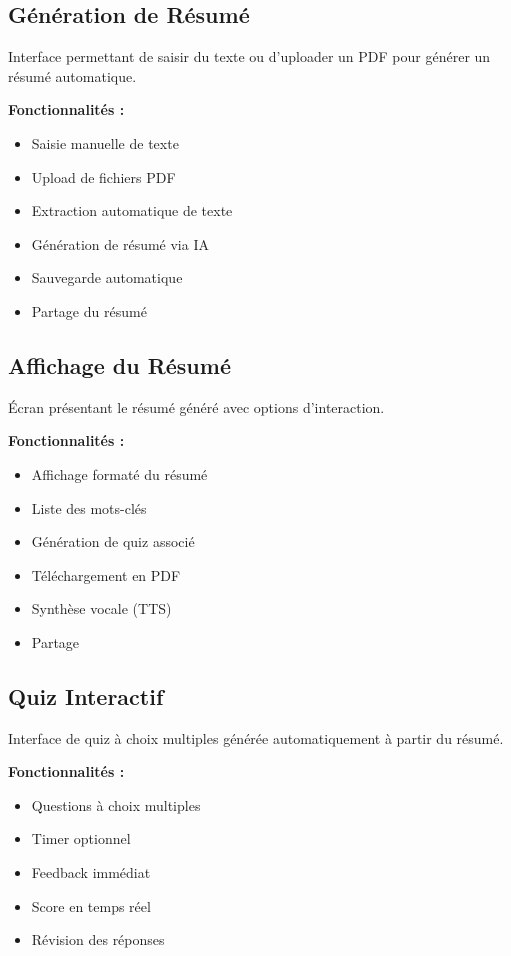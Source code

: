 \documentclass[12pt,a4paper]{report}
\begin{document}
\subsection{Génération de Résumé}

Interface permettant de saisir du texte ou d'uploader un PDF pour générer un résumé automatique.

\textbf{Fonctionnalités :}
\begin{itemize}
    \item Saisie manuelle de texte
    \item Upload de fichiers PDF
    \item Extraction automatique de texte
    \item Génération de résumé via IA
    \item Sauvegarde automatique
    \item Partage du résumé
\end{itemize}

\subsection{Affichage du Résumé}

Écran présentant le résumé généré avec options d'interaction.

\textbf{Fonctionnalités :}
\begin{itemize}
    \item Affichage formaté du résumé
    \item Liste des mots-clés
    \item Génération de quiz associé
    \item Téléchargement en PDF
    \item Synthèse vocale (TTS)
    \item Partage
\end{itemize}

\subsection{Quiz Interactif}

Interface de quiz à choix multiples générée automatiquement à partir du résumé.

\textbf{Fonctionnalités :}
\begin{itemize}
    \item Questions à choix multiples
    \item Timer optionnel
    \item Feedback immédiat
    \item Score en temps réel
    \item Révision des réponses
\end{itemize}
\end{document}
